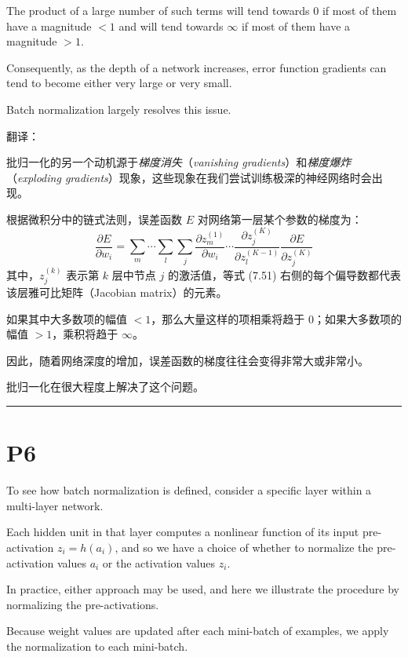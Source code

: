 \documentclass{article}
\begin{document}
The product of a large number of such terms will tend towards $0$ if most of them have a magnitude $<1$ and will tend towards $\infty$ if most of them have a magnitude $>1$. 

Consequently, as the depth of a network increases, error function gradients can tend to become either very large or very small. 

Batch normalization largely resolves this issue.

{\color{red}
翻译：

批归一化的另一个动机源于\emph{梯度消失}（\emph{vanishing gradients}）和\emph{梯度爆炸}（\emph{exploding gradients}）现象，这些现象在我们尝试训练极深的神经网络时会出现。

根据微积分中的链式法则，误差函数 $E$ 对网络第一层某个参数的梯度为：
\begin{equation}
    \frac{\partial E}{\partial w_i} = 
    \sum_m \cdots \sum_l \sum_j 
    \frac{\partial z_m^{(1)}}{\partial w_i}
    \cdots
    \frac{\partial z_j^{(K)}}{\partial z_l^{(K-1)}}
    \frac{\partial E}{\partial z_j^{(K)}} \tag{7.51}
\end{equation}
其中，$z_j^{(k)}$ 表示第 $k$ 层中节点 $j$ 的激活值，等式 (7.51) 右侧的每个偏导数都代表该层雅可比矩阵（Jacobian matrix）的元素。

如果其中大多数项的幅值 $<1$，那么大量这样的项相乘将趋于 $0$；如果大多数项的幅值 $>1$，乘积将趋于 $\infty$。

因此，随着网络深度的增加，误差函数的梯度往往会变得非常大或非常小。

批归一化在很大程度上解决了这个问题。
}

\noindent\rule{\linewidth}{0.4pt}

\section{P6}

To see how batch normalization is defined, consider a specific layer within a multi-layer network. 

Each hidden unit in that layer computes a nonlinear function of its input pre-activation $z_i = h(a_i)$, and so we have a choice of whether to normalize the pre-activation values $a_i$ or the activation values $z_i$. 

In practice, either approach may be used, and here we illustrate the procedure by normalizing the pre-activations. 

Because weight values are updated after each mini-batch of examples, we apply the normalization to each mini-batch. 
\end{document}
